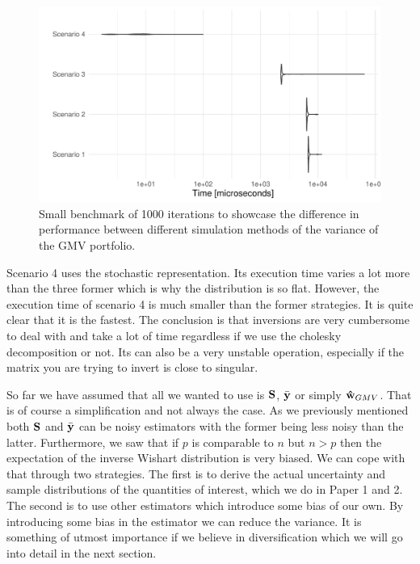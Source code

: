 \documentclass[oneside]{book}\usepackage{knitr}
\begin{document}
\begin{knitrout}\small
{}\color{fgcolor}\begin{figure}

{\centering \includegraphics[width=\maxwidth]{figure/microbenchmark_output-1} 

}

\caption[Small benchmark of 1000 iterations to showcase the difference in performance between different simulation methods of the variance of the GMV portfolio]{Small benchmark of 1000 iterations to showcase the difference in performance between different simulation methods of the variance of the GMV portfolio.}\label{fig:microbenchmark_output}
\end{figure}

\end{knitrout}

Scenario 4 uses the stochastic representation. 
Its execution time varies a lot more than the three former which is why the distribution is so flat.
However, the execution time of scenario 4 is much smaller than the former strategies.
It is quite clear that it is the fastest. 
The conclusion is that inversions are very cumbersome to deal with and take a lot of time regardless if we use the cholesky decomposition or not.
Its can also be a very unstable operation, especially if the matrix you are trying to invert is close to singular.

So far we have assumed that all we wanted to use is $\mathbf{S}$, $\bar{\mathbf{y}}$ or simply $\mathbf{\hat{w}}_{GMV}$.
That is of course a simplification and not always the case.
As we previously mentioned both $\mathbf{S}$ and $\bar{\mathbf{y}}$ can be noisy estimators with the former being less noisy than the latter. 
Furthermore, we saw that if $p$ is comparable to $n$ but $n>p$ then the expectation of the inverse Wishart distribution is very biased.
We can cope with that through two strategies. 
The first is to derive the actual uncertainty and sample distributions of the quantities of interest, which we do in Paper 1 and 2.
The second is to use other estimators which introduce some bias of our own.
By introducing some bias in the estimator we can reduce the variance.
It is something of utmost importance if we believe in diversification which we will go into detail in the next section.
\end{document}
